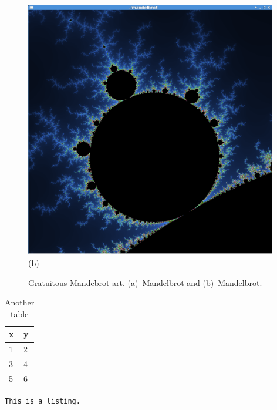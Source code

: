 \begin{figure}
\begin{minipage}{0.5\textwidth}
\includegraphics[width=0.98\textwidth]{figures/mandelbrot.png}
\\ (b)
\end{minipage}%
\caption{Gratuitous Mandebrot art.
(a)~Mandelbrot and (b)~Mandelbrot.}
\end{figure}

\begin{table}\centering%
\begin{tabular}{|l|l|}%
\hline
x & y \\
\hline
1 & 2 \\
3 & 4 \\
5 & 6 \\
\hline
\end{tabular}%
\caption{Another table}
\end{table}

\begin{lstlisting}[caption={Some caption.},frame=single]
This is a listing.
\end{lstlisting}


